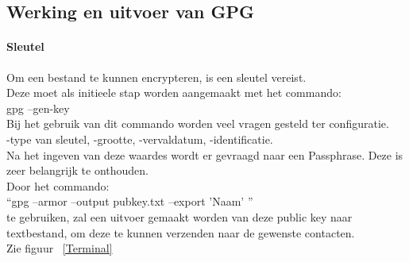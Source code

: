 \documentclass[12pt]{article}
\begin{document}
			\newpage		
			\subsection{Werking en uitvoer van GPG}\label{Werk}	
				\paragraph*{Sleutel} 
				Om een bestand te kunnen encrypteren, is een sleutel vereist.\\
				Deze moet als initieele stap worden aangemaakt met het commando:\\
				gpg --gen-key\\
				Bij het gebruik van dit commando worden veel vragen gesteld ter configuratie.\\
				-type van sleutel, -grootte, -vervaldatum, -identificatie.\\
				Na het ingeven van deze waardes wordt er gevraagd naar een Passphrase.
				Deze is zeer belangrijk te onthouden.\\
				Door het commando:\\
				\textquotedblleft  gpg --armor --output pubkey.txt --export 'Naam' \textquotedblright\\
				te gebruiken, zal een uitvoer gemaakt worden van deze public key naar textbestand,
				om deze te kunnen verzenden naar de gewenste contacten.\\
				Zie figuur ~\ref{Terminal}\\
				
\end{document}
